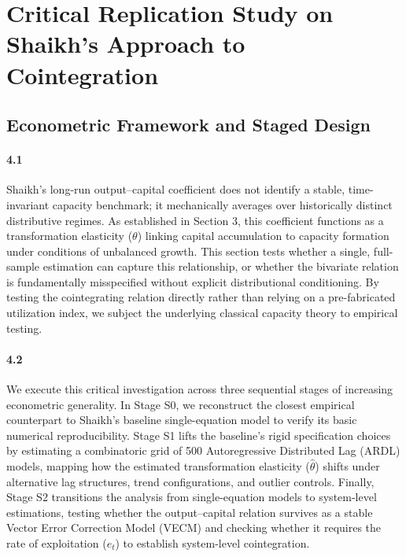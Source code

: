 \section{Critical Replication Study on Shaikh’s Approach to Cointegration}
\label{sec:replication_strategy}
\subsection{Econometric Framework and Staged Design}
\label{subsec:econometric_framework_design}

\paragraph{4.1}
Shaikh’s long-run output–capital coefficient does not identify a stable, time-invariant capacity benchmark; it mechanically averages over historically distinct distributive regimes. As established in Section 3, this coefficient functions as a transformation elasticity ($\theta$) linking capital accumulation to capacity formation under conditions of unbalanced growth. This section tests whether a single, full-sample estimation can capture this relationship, or whether the bivariate relation is fundamentally misspecified without explicit distributional conditioning. By testing the cointegrating relation directly rather than relying on a pre-fabricated utilization index, we subject the underlying classical capacity theory to empirical testing.

\paragraph{4.2}
We execute this critical investigation across three sequential stages of increasing econometric generality. In Stage S0, we reconstruct the closest empirical counterpart to Shaikh's baseline single-equation model to verify its basic numerical reproducibility. Stage S1 lifts the baseline's rigid specification choices by estimating a combinatoric grid of 500 Autoregressive Distributed Lag (ARDL) models, mapping how the estimated transformation elasticity ($\hat{\theta}$) shifts under alternative lag structures, trend configurations, and outlier controls. Finally, Stage S2 transitions the analysis from single-equation models to system-level estimations, testing whether the output--capital relation survives as a stable Vector Error Correction Model (VECM) and checking whether it requires the rate of exploitation ($e_t$) to establish system-level cointegration.

